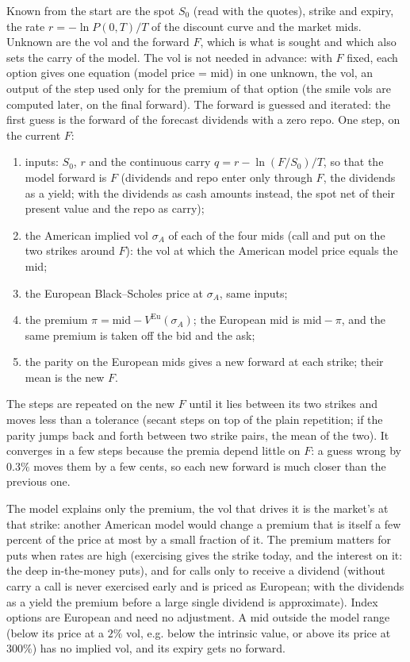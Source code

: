 Known from the start are the spot $S_0$ (read with the quotes), strike and expiry, the rate $r = -\ln P(0,T)/T$ of
the discount curve and the market mids. Unknown are the vol and the forward $F$, which is what is sought and which
also sets the carry of the model. The vol is not needed in advance: with $F$ fixed, each option gives one equation
(model price = mid) in one unknown, the vol, an output of the step used only for the premium of that option (the
smile vols are computed later, on the final forward). The forward is guessed and iterated: the first guess is the
forward of the forecast dividends with a zero repo. One step, on the current $F$:
\begin{enumerate}[nosep]
  \item inputs: $S_0$, $r$ and the continuous carry $q = r - \ln(F/S_0)/T$, so that the model forward is $F$
        (dividends and repo enter only through $F$, the dividends as a yield; with the dividends as cash amounts
        instead, the spot net of their present value and the repo as carry);
  \item the American implied vol $\sigma_A$ of each of the four mids (call and put on the two strikes around $F$):
        the vol at which the American model price equals the mid;
  \item the European Black--Scholes price at $\sigma_A$, same inputs;
  \item the premium $\pi = \text{mid} - V^{\mathrm{Eu}}(\sigma_A)$; the European mid is $\text{mid} - \pi$, and the same
        premium is taken off the bid and the ask;
  \item the parity on the European mids gives a new forward at each strike; their mean is the new $F$.
\end{enumerate}
The steps are repeated on the new $F$ until it lies between its two strikes and moves less than a tolerance (secant
steps on top of the plain repetition; if the parity jumps back and forth between two strike pairs, the mean of the
two). It converges in a few steps because the premia depend little on $F$: a guess wrong by $0.3\%$ moves them by a
few cents, so each new forward is much closer than the previous one.

The model explains only the premium, the vol that drives it is the market's at that strike: another American model
would change a premium that is itself a few percent of the price at most by a small fraction of it. The premium
matters for puts when rates are high (exercising gives the strike today, and the interest on it: the deep
in-the-money puts), and for calls only to receive a dividend (without carry a call is never exercised early and is
priced as European; with the dividends as a yield the premium before a large single dividend is approximate). Index
options are European and need no adjustment. A mid outside the model range (below its price at a $2\%$ vol, e.g.
below the intrinsic value, or above its price at $300\%$) has no implied vol, and its expiry gets no forward.

